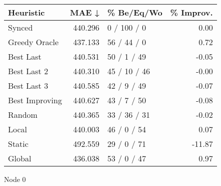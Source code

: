 \begin{tabular}{lrlr}
\toprule
\textbf{Heuristic} & \textbf{MAE ↓} & \textbf{\% Be/Eq/Wo} & \textbf{\% Improv.} \\
\midrule
            Synced &        440.296 &          0 / 100 / 0 &                0.00 \\
     Greedy Oracle &        437.133 &          56 / 44 / 0 &                0.72 \\
         Best Last &        440.531 &          50 / 1 / 49 &               -0.05 \\
       Best Last 2 &        440.310 &         45 / 10 / 46 &               -0.00 \\
       Best Last 3 &        440.585 &          42 / 9 / 49 &               -0.07 \\
    Best Improving &        440.627 &          43 / 7 / 50 &               -0.08 \\
            Random &        440.365 &         33 / 36 / 31 &               -0.02 \\
             Local &        440.003 &          46 / 0 / 54 &                0.07 \\
            Static &        492.559 &          29 / 0 / 71 &              -11.87 \\
            Global &        436.038 &          53 / 0 / 47 &                0.97 \\
\bottomrule
\end{tabular}
\caption{Node 0}
\label{tab:non_lr05_le1_bs4_0}
